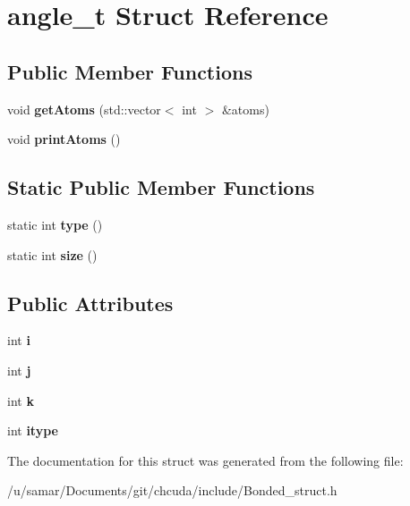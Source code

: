 \hypertarget{structangle__t}{}\section{angle\+\_\+t Struct Reference}
\label{structangle__t}
\subsection*{Public Member Functions}
\begin{DoxyCompactItemize}
\item 
\hypertarget{structangle__t_a73bb91ebf7522e1729c8cb5dfda8d702}{}\label{structangle__t_a73bb91ebf7522e1729c8cb5dfda8d702} 
void {\bfseries get\+Atoms} (std\+::vector$<$ int $>$ \&atoms)
\item 
\hypertarget{structangle__t_afb00e2ffaf046b1682c4a2e89172a0fc}{}\label{structangle__t_afb00e2ffaf046b1682c4a2e89172a0fc} 
void {\bfseries print\+Atoms} ()
\end{DoxyCompactItemize}
\subsection*{Static Public Member Functions}
\begin{DoxyCompactItemize}
\item 
\hypertarget{structangle__t_a0b9a92d251c38156ec986de182f071de}{}\label{structangle__t_a0b9a92d251c38156ec986de182f071de} 
static int {\bfseries type} ()
\item 
\hypertarget{structangle__t_a17c15f2092689a13093aa0e14e8f4b03}{}\label{structangle__t_a17c15f2092689a13093aa0e14e8f4b03} 
static int {\bfseries size} ()
\end{DoxyCompactItemize}
\subsection*{Public Attributes}
\begin{DoxyCompactItemize}
\item 
\hypertarget{structangle__t_a00cbd9725c2b99b12dd84e0344a8d5cc}{}\label{structangle__t_a00cbd9725c2b99b12dd84e0344a8d5cc} 
int {\bfseries i}
\item 
\hypertarget{structangle__t_a9ffe5c192d3827b6c1653da8e956d15a}{}\label{structangle__t_a9ffe5c192d3827b6c1653da8e956d15a} 
int {\bfseries j}
\item 
\hypertarget{structangle__t_a86a98e55f6d6dabd2ad2a25400ff2a34}{}\label{structangle__t_a86a98e55f6d6dabd2ad2a25400ff2a34} 
int {\bfseries k}
\item 
\hypertarget{structangle__t_ac2b449444d315f8af07927b231ef05e4}{}\label{structangle__t_ac2b449444d315f8af07927b231ef05e4} 
int {\bfseries itype}
\end{DoxyCompactItemize}


The documentation for this struct was generated from the following file\+:\begin{DoxyCompactItemize}
\item 
/u/samar/\+Documents/git/chcuda/include/Bonded\+\_\+struct.\+h\end{DoxyCompactItemize}
